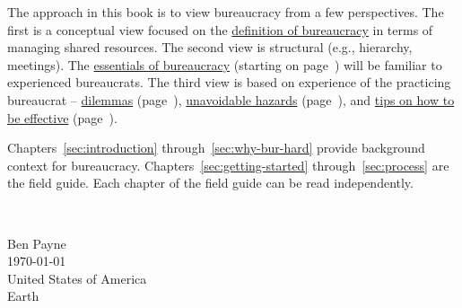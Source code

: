 

The approach in this book is to view bureaucracy from a few perspectives. The first is a conceptual view focused on the \hyperref[sec:define-bureaucracy]{definition of bureaucracy} in terms of managing shared resources. The second view is structural (e.g., hierarchy, meetings). The \hyperref[sec:fundamentals-of-b]{essentials of bureaucracy} (starting on page~\pageref{sec:fundamentals-of-b})
will be familiar to experienced bureaucrats. 
The third view is based on experience of the practicing bureaucrat -- \hyperref[sec:dilemma-trilemma]{dilemmas} (page~\pageref{sec:dilemma-trilemma}), \hyperref[sec:unavoidable-hazards]{unavoidable hazards} (page~\pageref{sec:unavoidable-hazards}), and \hyperref[sec:effective-bureaucrat]{tips on how to be effective} (page~\pageref{sec:effective-bureaucrat}). 



Chapters~\ref{sec:introduction} through~\ref{sec:why-bur-hard} provide background context for bureaucracy. 
Chapters~\ref{sec:getting-started} through~\ref{sec:process} are the field guide. 
Each chapter of the field guide can be read independently. 



\ \\

\begin{flushright}
Ben Payne\\
\today\\
United States of America\\
Earth
\end{flushright}


